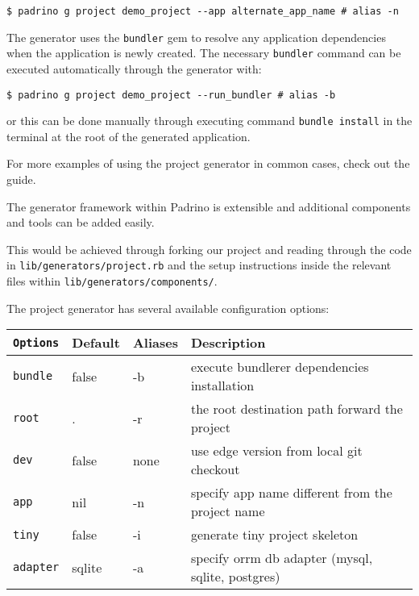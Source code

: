 \begin{verbatim}
$ padrino g project demo_project --app alternate_app_name # alias -n
\end{verbatim}
The generator uses the \verb|bundler| gem to resolve any application
dependencies when the application is newly created. The necessary
\verb|bundler| command can be executed automatically through the generator
with:

\begin{verbatim}
$ padrino g project demo_project --run_bundler # alias -b
\end{verbatim}
or this can be done manually through executing command 
\verb|bundle install|
in the terminal at the root of the generated application.

For more examples of using the project generator in common cases, check out the 
guide.

The generator framework within Padrino is extensible and additional
components and tools can be added easily.

This would be achieved through forking our project and reading
through the code in \verb|lib/generators/project.rb| and the setup
instructions inside the relevant files within \verb|lib/generators/components/|.



The project generator has several available configuration options:

\begin{tabular}{|p{2cm}|l|l|l|}
\hline
\verb|Options| & Default & Aliases & Description\\ \hline
\verb|bundle|  & false   & -b      & execute bundlerer dependencies installation\\ \hline
\verb|root|    & .       & -r      & the root destination path forward the project\\ \hline
\verb|dev|     & false   & none    & use edge version from local git checkout\\ \hline
\verb|app|     & nil     & -n      & specify app name different from the project name\\ \hline
\verb|tiny|    & false   & -i      & generate tiny project skeleton\\ \hline
\verb|adapter| & sqlite  & -a      & specify orrm db adapter (mysql, sqlite, postgres)\\ \hline
\end{tabular}

